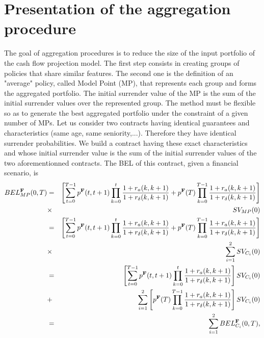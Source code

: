\section{Presentation of the aggregation procedure}
The goal of aggregation procedures is to reduce the size of the input portfolio of the cash flow projection model. The first step consists in creating groups of policies that share similar features. The second one is the definition of an "average" policy, called Model Point (MP), that represents each group and forms the aggregated portfolio. The initial surrender value of the MP is the sum of the initial surrender values over the represented group. The method must be flexible so as to generate the best aggregated portfolio under the constraint of a given number of MPs. Let us consider two contracts having identical guarantees and characteristics (same age, same seniority,...). Therefore they have identical surrender probabilities. We build a contract having these exact characteristics and whose initial surrender value is the sum of the initial surrender values of the two aforementionned contracts. The BEL of this contract, given a financial scenario, is
\begin{eqnarray}
BEL_{MP}^{\bold{F}}(0,T)&=&\left[\sum_{t=0}^{T-1}p^{\bold{F}}(t,t+1)\prod^{t}_{k=0}\frac{1+r_{a}(k,k+1)}{1+r_{\delta}(k,k+1)}+p^{\bold{F}}(T)\prod^{T-1}_{k=0}\frac{1+r_{a}(k,k+1)}{1+r_{\delta}(k,k+1)}\right]\nonumber\\
&\times&SV_{MP}(0)\nonumber\\
&=&\left[\sum_{t=0}^{T-1}p^{\bold{F}}(t,t+1)\prod^{t}_{k=0}\frac{1+r_{a}(k,k+1)}{1+r_{\delta}(k,k+1)}+p^{\bold{F}}(T)\prod^{T-1}_{k=0}\frac{1+r_{a}(k,k+1)}{1+r_{\delta}(k,k+1)}\right]\nonumber\\
&\times&\sum_{i=1}^{2}SV_{C_{i}}(0)\nonumber\\
&=&\left[\sum_{t=0}^{T-1}p^{\bold{F}}(t,t+1)\prod^{t}_{k=0}\frac{1+r_{a}(k,k+1)}{1+r_{\delta}(k,k+1)}\right]SV_{C_{i}}(0)\\
&+&\sum_{i=1}^{2}\left[p^{\bold{F}}(T)\prod^{T-1}_{k=0}\frac{1+r_{a}(k,k+1)}{1+r_{\delta}(k,k+1)}\right]SV_{C_{i}}(0)\nonumber\\
&=&\sum_{i=1}^{2}BEL_{C_{i}}^{\bold{F}}(0,T),
\end{eqnarray}
